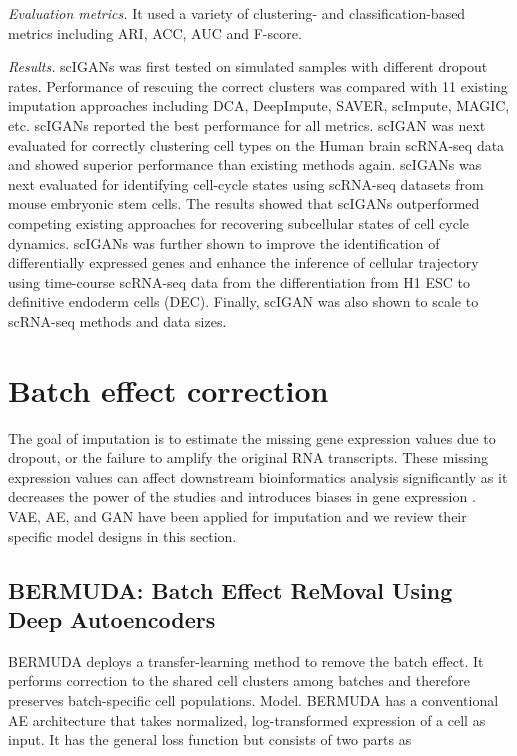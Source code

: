 \documentclass[
]{book}
\begin{document}
\emph{Evaluation metrics.} It used a variety of clustering- and classification-based metrics including ARI, ACC, AUC and F-score.

\emph{Results.} scIGANs was first tested on simulated samples with different dropout rates. Performance of rescuing the correct clusters was compared with 11 existing imputation approaches including DCA, DeepImpute, SAVER, scImpute, MAGIC, etc. scIGANs reported the best performance for all metrics. scIGAN was next evaluated for correctly clustering cell types on the Human brain scRNA-seq data and showed superior performance than existing methods again. scIGANs was next evaluated for identifying cell-cycle states using scRNA-seq datasets from mouse embryonic stem cells. The results showed that scIGANs outperformed competing existing approaches for recovering subcellular states of cell cycle dynamics. scIGANs was further shown to improve the identification of differentially expressed genes and enhance the inference of cellular trajectory using time-course scRNA-seq data from the differentiation from H1 ESC to definitive endoderm cells (DEC). Finally, scIGAN was also shown to scale to scRNA-seq methods and data sizes.

\hypertarget{ch-5-2}{%
\section{Batch effect correction}\label{ch-5-2}}

The goal of imputation is to estimate the missing gene expression values due to dropout, or the failure to amplify the original RNA transcripts. These missing expression values can affect downstream bioinformatics analysis significantly as it decreases the power of the studies and introduces biases in gene expression \citep{RN46}. VAE, AE, and GAN have been applied for imputation and we review their specific model designs in this section.

\hypertarget{ch-5-2-1}{%
\subsection{BERMUDA: Batch Effect ReMoval Using Deep Autoencoders}\label{ch-5-2-1}}

BERMUDA \citep{RN183} deploys a transfer-learning method to remove the batch effect. It performs correction to the shared cell clusters among batches and therefore preserves batch-specific cell populations.
Model. BERMUDA has a conventional AE architecture that takes normalized, log-transformed expression of a cell as input. It has the general loss function but consists of two parts as
\end{document}

